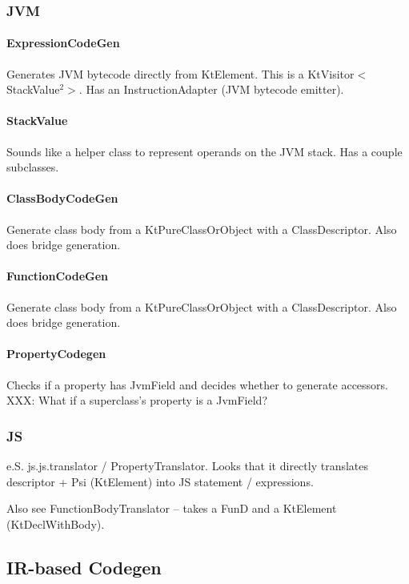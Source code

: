 \documentclass{article}
\begin{document}
\subsubsection{JVM}

\paragraph{ExpressionCodeGen}
Generates JVM bytecode directly from KtElement. This is a KtVisitor$<$StackValue$^2$$>$. Has an InstructionAdapter (JVM bytecode emitter).

\paragraph{StackValue}
Sounds like a helper class to represent operands on the JVM stack. Has a couple subclasses.

\paragraph{ClassBodyCodeGen}
Generate class body from a KtPureClassOrObject with a ClassDescriptor. Also does bridge generation.

\paragraph{FunctionCodeGen}
Generate class body from a KtPureClassOrObject with a ClassDescriptor. Also does bridge generation.

\paragraph{PropertyCodegen}

Checks if a property has JvmField and decides whether to generate accessors. XXX: What if a superclass's property is a JvmField?

\subsubsection{JS}

e.S. js.js.translator / PropertyTranslator. Looks that it directly translates descriptor + Psi (KtElement) into JS statement / expressions.

Also see FunctionBodyTranslator -- takes a FunD and a KtElement (KtDeclWithBody).

\subsection{IR-based Codegen}
\end{document}
